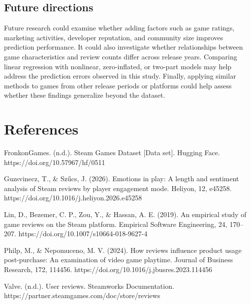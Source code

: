 \documentclass[
  letterpaper,
  DIV=11,
  numbers=noendperiod]{scrartcl}
\begin{document}
\subsection{Future directions}\label{future-directions}

Future research could examine whether adding factors such as game
ratings, marketing activities, developer reputation, and community size
improves prediction performance. It could also investigate whether
relationships between game characteristics and review counts differ
across release years. Comparing linear regression with nonlinear,
zero-inflated, or two-part models may help address the prediction errors
observed in this study. Finally, applying similar methods to games from
other release periods or platforms could help assess whether these
findings generalize beyond the dataset.

\section{References}\label{references}

FronkonGames. (n.d.). Steam Games Dataset {[}Data set{]}. Hugging Face.
https://doi.org/10.57967/hf/0511

Guzsvinecz, T., \& Szűcs, J. (2026). Emotions in play: A length and
sentiment analysis of Steam reviews by player engagement mode. Heliyon,
12, e45258. https://doi.org/10.1016/j.heliyon.2026.e45258

Lin, D., Bezemer, C. P., Zou, Y., \& Hassan, A. E. (2019). An empirical
study of game reviews on the Steam platform. Empirical Software
Engineering, 24, 170--207. https://doi.org/10.1007/s10664-018-9627-4

Philp, M., \& Nepomuceno, M. V. (2024). How reviews influence product
usage post-purchase: An examination of video game playtime. Journal of
Business Research, 172, 114456.
https://doi.org/10.1016/j.jbusres.2023.114456

Valve. (n.d.). User reviews. Steamworks Documentation.
https://partner.steamgames.com/doc/store/reviews
\end{document}
